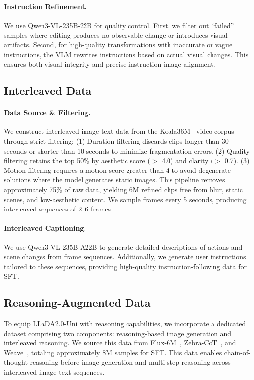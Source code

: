 \paragraph{Instruction Refinement.}
We use Qwen3-VL-235B-22B for quality control.
%
First, we filter out ``failed'' samples where editing produces no observable change or introduces visual artifacts. 
%
Second, for high-quality transformations with inaccurate or vague instructions, the VLM rewrites instructions based on actual visual changes.
%
This ensures both visual integrity and precise instruction-image alignment.


\subsection{Interleaved Data}
\paragraph{Data Source \& Filtering.} 
We construct interleaved image-text data from the Koala36M~\citep{wang2025koala} video corpus through strict filtering:
%
(1) Duration filtering discards clips longer than 30 seconds or shorter than 10 seconds to minimize fragmentation errors.
%
(2) Quality filtering retains the top 50\% by aesthetic score ($>$ 4.0) and clarity ($>$ 0.7).
%
(3) Motion filtering requires a motion score greater than 4 to avoid degenerate solutions where the model generates static images.
%
This pipeline removes approximately 75\% of raw data, yielding 6M refined clips free from blur, static scenes, and low-aesthetic content.
%
We sample frames every 5 seconds, producing interleaved sequences of 2--6 frames.


\paragraph{Interleaved Captioning.} 
We use Qwen3-VL-235B-A22B to generate detailed descriptions of actions and scene changes from frame sequences.
%
Additionally, we generate user instructions tailored to these sequences, providing high-quality instruction-following data for SFT.


\subsection{Reasoning-Augmented Data}
To equip LLaDA2.0-Uni with reasoning capabilities, we incorporate a dedicated dataset comprising two components: reasoning-based image generation and interleaved reasoning.
%
We source this data from Flux-6M~\citep{fang2025flux}, Zebra-CoT~\citep{li2026zebracot}, and Weave~\citep{weave2024}, totaling approximately 8M samples for SFT.
%
This data enables chain-of-thought reasoning before image generation and multi-step reasoning across interleaved image-text sequences.
